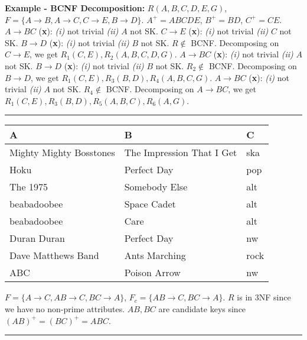 \documentclass{report}
\renewcommand{\bf}[1]{\textbf{{#1}}}
\renewcommand{\it}[1]{\textit{{#1}}}
\begin{document}
\bf{Example - BCNF Decomposition:} $R(A, B, C, D, E, G)$, $F = \{A \to B, A \to C, C \to E, B \to
D\}$. $A^+ = ABCDE$, $B^+ = BD$, $C^+ = CE$.
\hfil \newline
$A \to BC$ (\bf{\textsf{x}}): \it{(i)} not trivial \it{(ii)} $A$ not SK.
\hfil \newline
$C \to E$ (\bf{\textsf{x}}): \it{(i)} not trivial \it{(ii)} $C$ not SK.
\hfil \newline
$B \to D$ (\bf{\textsf{x}}): \it{(i)} not trivial \it{(ii)} $B$ not SK.
\hfil \newline
$R \not \in$ BCNF. Decomposing on $C \to E$, we get $R_1(C, E), R_2(A, B, C, D, G)$.
\hfil \newline
$A \to BC$ (\bf{\textsf{x}}): \it{(i)} not trivial \it{(ii)} $A$ not SK.
\hfil \newline
$B \to D$ (\bf{\textsf{x}}): \it{(i)} not trivial \it{(ii)} $B$ not SK.
\hfil \newline
$R_2 \not \in$ BCNF. Decomposing on $B \to D$, we get $R_1(C, E), R_3(B, D), R_4(A, B, C, G)$.
\hfil \newline
$A \to BC$ (\bf{\textsf{x}}): \it{(i)} not trivial \it{(ii)} $A$ not SK.
\hfil \newline
$R_4 \not \in$ BCNF. Decomposing on $A \to BC$, we get $R_1(C, E), R_3(B, D), R_5(A, B, C), R_6(A, G)$.
\hfil \newline
\vspace{-0.8em}
\hrule
\vspace{-0.8em}
\begin{multicols}{2}
\begin{tabular}{l|l|l}
A & B & C \\ 
\hline
Mighty Mighty Bosstones & The Impression That I Get & ska      \\
Hoku                   & Perfect Day                & pop      \\
The 1975               & Somebody Else              & alt \\
beabadoobee            & Space Cadet                & alt \\
beabadoobee            & Care                       & alt \\
Duran Duran            & Perfect Day                & nw \\
Dave Matthews Band     & Ants Marching              & rock \\
ABC                    & Poison Arrow               & nw \\
\end{tabular}
\columnbreak

$F = \{A \to C, AB \to C, BC \to A\}$, $F_c = \{AB \to C, BC \to A\}$.
$R$ is in 3NF since we have no non-prime attributes. $AB, BC$ are candidate keys since $(AB)^+ =
(BC)^+ = ABC$.
\end{multicols}
\vspace{-0.5em}
\hrule
\vspace{0.2em}
\end{document}

